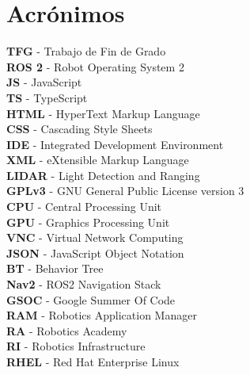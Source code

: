 \chapter*{Acrónimos}

\noindent \textbf{TFG} - Trabajo de Fin de Grado \\
\textbf{ROS 2} - Robot Operating System 2 \\
\textbf{JS} - JavaScript \\
\textbf{TS} - TypeScript \\
\textbf{HTML} - HyperText Markup Language \\
\textbf{CSS} - Cascading Style Sheets \\
\textbf{IDE} - Integrated Development Environment \\
\textbf{XML} - eXtensible Markup Language \\
\textbf{LIDAR} - Light Detection and Ranging \\
\textbf{GPLv3} - GNU General Public License version 3 \\ 
\textbf{CPU} - Central Processing Unit \\
\textbf{GPU} - Graphics Processing Unit \\
\textbf{VNC} - Virtual Network Computing \\ 
\textbf{JSON} - JavaScript Object Notation \\
\textbf{BT} - Behavior Tree \\
\textbf{Nav2} - ROS2 Navigation Stack \\
\textbf{GSOC} - Google Summer Of Code \\
\textbf{RAM} - Robotics Application Manager \\
\textbf{RA} - Robotics Academy \\
\textbf{RI} - Robotics Infrastructure \\
\textbf{RHEL} - Red Hat Enterprise Linux \\